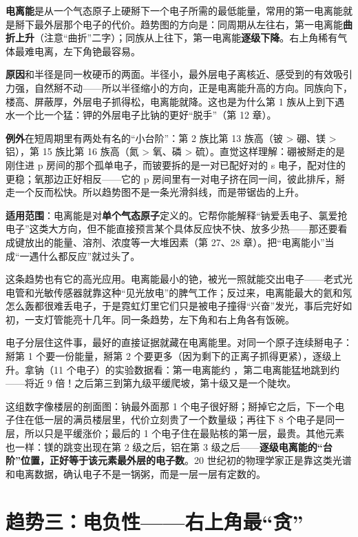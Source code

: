 \textbf{电离能}是从一个气态原子上硬掰下一个电子所需的最低能量，常用的第一电离能就是掰下最外层那个电子的代价。趋势图的方向是：同周期从左往右，第一电离能\textbf{曲折上升}（注意“曲折”二字）；同族从上往下，第一电离能\textbf{逐级下降}。右上角稀有气体最难电离，左下角铯最容易。

\textbf{原因}和半径是同一枚硬币的两面。半径小，最外层电子离核近、感受到的有效吸引力强，自然掰不动——所以半径缩小的方向，正是电离能升高的方向。同族向下，楼高、屏蔽厚，外层电子抓得松，电离能就降。这也是为什么第 1 族从上到下遇水一个比一个猛：钾的外层电子比钠的更好“脱手”（第 12 章）。

\textbf{例外}在短周期里有两处有名的“小台阶”：第 2 族比第 13 族高（铍 > 硼、镁 > 铝），第 15 族比第 16 族高（氮 > 氧、磷 > 硫）。直觉这样理解：硼被掰走的是刚住进 p 房间的那个孤单电子，而铍要拆的是一对已配好对的 s 电子，配对住的更稳；氧那边正好相反——它的 p 房间里有一对电子挤在同一间，彼此排斥，掰走一个反而松快。所以趋势图不是一条光滑斜线，而是带锯齿的上升。

\textbf{适用范围}：电离能是对\textbf{单个气态原子}定义的。它帮你能解释“钠爱丢电子、氯爱抢电子”这类大方向，但不能直接预言某个具体反应快不快、放多少热——那还要看成键放出的能量、溶剂、浓度等一大堆因素（第 27、28 章）。把“电离能小”当成“一遇什么都反应”就过头了。

这条趋势也有它的高光应用。电离能最小的铯，被光一照就能交出电子——老式光电管和光敏传感器就靠这种“见光放电”的脾气工作；反过来，电离能最大的氦和氖怎么轰都很难丢电子，于是霓虹灯里它们只是被电子撞得“兴奋”发光，事后完好如初，一支灯管能亮十几年。同一条趋势，左下角和右上角各有饭碗。

\begin{zhengju}
电子分层住这件事，最好的直接证据就藏在电离能里。对同一个原子连续掰电子：掰第 1 个要一份能量，掰第 2 个要更多（因为剩下的正离子抓得更紧），逐级上升。拿钠（11 个电子）的实验数据看：第一电离能约 ，第二电离能猛地跳到约 ——将近 9 倍！之后第三到第九级平缓爬坡，第十级又是一个陡坎。

这组数字像楼层的剖面图：钠最外面那 1 个电子很好掰；掰掉它之后，下一个电子住在低一层的满员楼层里，代价立刻贵了一个数量级；再往下 8 个电子是同一层，所以只是平缓涨价；最后的 1 个电子住在最贴核的第一层，最贵。其他元素也一样：镁的跳变出现在第 2 级之后，铝在第 3 级之后——\textbf{逐级电离能的“台阶”位置，正好等于该元素最外层的电子数}。20 世纪初的物理学家正是靠这类光谱和电离数据，确认电子不是一锅粥，而是一层一层有定数的。
\end{zhengju}

\section{趋势三：电负性——右上角最“贪”}

